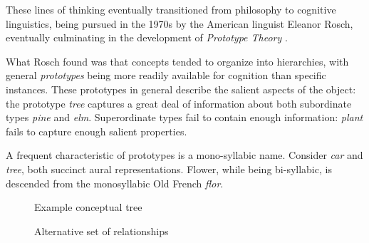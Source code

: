 \bigskip

These lines of thinking eventually transitioned from philosophy to cognitive linguistics, being pursued in the 1970s by the American linguist Eleanor Rosch, eventually culminating in the development of \textit{Prototype Theory} \cite{rosch:1973} \cite{rosch:1975}.

What Rosch found was that concepts tended to organize into hierarchies, with general \textit{prototypes} being more readily available for cognition than specific instances.
These prototypes in general describe the salient aspects of the object: the prototype \textit{tree} captures a great deal of information about both subordinate types \textit{pine} and \textit{elm}.
Superordinate types fail to contain enough information: \textit{plant} fails to capture enough salient properties.

A frequent characteristic of prototypes is a mono-syllabic name.
Consider \textit{car} and \textit{tree}, both succinct aural representations.
Flower, while being bi-syllabic, is descended from the monosyllabic Old French \textit{flor}.

\begin{figure}[hbt]
\begin{center}
\end{center}
\caption{Example conceptual tree}
\end{figure}


\begin{figure}[hbt]
\begin{center}
\end{center}
\caption{Alternative set of relationships}
\end{figure}

